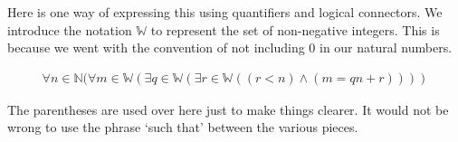 \documentclass[12pt]{article}
\begin{document}
Here is one way of expressing this using quantifiers and logical connectors. We introduce the notation $\mathbb{W}$ to represent the set of non-negative integers. 
This is because we went with the convention of not including 0 in our natural numbers.

\begin{align*}
\forall n \in \mathbb{N} (\forall m \in \mathbb{W} (\exists q \in \mathbb{W} (\exists r \in \mathbb{W}  ((r < n) \wedge (m = qn +r))))
\end{align*}

The parentheses are used over here just to make things clearer. It would not be wrong to use the phrase `such that' between the various pieces. 
\end{document}
